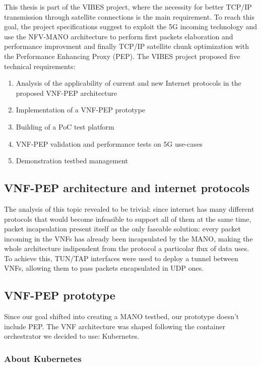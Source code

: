 \documentclass[10pt]{book}
\begin{document}
 This thesis is part of the VIBES project, where the necessity for better TCP/IP
transmission through satellite connections is the main requirement. To
reach this goal, the project specifications suggest to exploit the 5G incoming
technology and use the NFV-MANO architecture to perform first packets
elaboration and performance improvment and finally TCP/IP satellite chunk
optimization with the Performance Enhancing Proxy (PEP). The VIBES project
proposed five technical requirements:
\begin{enumerate}
 \item Analysis of the applicability of current and new Internet protocols in
the proposed VNF-PEP architecture
 \item Implementation of a VNF-PEP prototype
 \item Building of a PoC test platform
 \item VNF-PEP validation and performance tests on 5G use-cases
 \item Demonstration testbed management
\end{enumerate}

\subsection{VNF-PEP architecture and internet protocols}

The analysis of this topic revealed to be trivial: since internet has many
different protocols that would become infeasible to support all of them at the
same time, packet incapsulation present itself as the only faseable solution:
every packet incoming in the VNFs has already been incapsulated by the MANO,
 making the whole
architecture indipendent from the protocol a particolar flux of data uses. To
achieve this, TUN/TAP interfaces were used to deploy a
tunnel between VNFs, allowing them to pass packets encapsulated in UDP ones.

\subsection{VNF-PEP prototype}

Since our goal shifted into creating a MANO testbed, our prototype doesn't
include PEP. The VNF architecture was shaped following the container
orchestrator we decided to use: Kubernetes.

\subsubsection{About Kubernetes}
\end{document}

